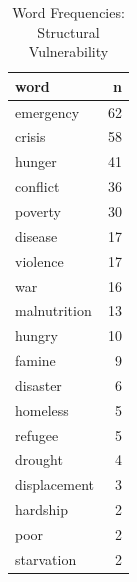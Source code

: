 \begin{table}[ht]
\centering
\begin{tabular}{lr}
  \hline
word & n \\ 
  \hline
emergency &  62 \\ 
  crisis &  58 \\ 
  hunger &  41 \\ 
  conflict &  36 \\ 
  poverty &  30 \\ 
  disease &  17 \\ 
  violence &  17 \\ 
  war &  16 \\ 
  malnutrition &  13 \\ 
  hungry &  10 \\ 
  famine &   9 \\ 
  disaster &   6 \\ 
  homeless &   5 \\ 
  refugee &   5 \\ 
  drought &   4 \\ 
  displacement &   3 \\ 
  hardship &   2 \\ 
  poor &   2 \\ 
  starvation &   2 \\ 
   \hline
\end{tabular}
\caption{Word Frequencies: Structural Vulnerability} 
\end{table}
